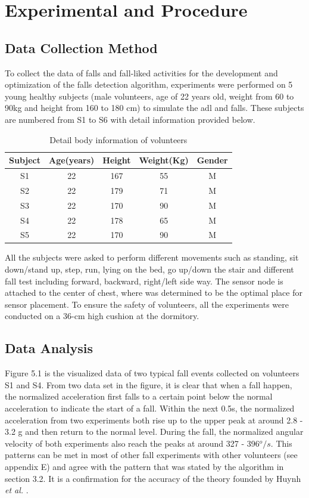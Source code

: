 \documentclass[letterpaper,12pt,titlepage,oneside,final]{book}
\begin{document}
\chapter{Experimental and Procedure}

\section{Data Collection Method}
To collect the data of falls and fall-liked activities for the development and optimization of the falls detection algorithm, experiments were performed on 5 young healthy subjects (male volunteers, age of 22 years old, weight from 60 to 90kg and height from 160 to 180 cm) to simulate the \gls{adl} and falls. These subjects are numbered from S1 to S6 with detail information provided below.
\begin{table}[h]
	\begin{center}
		\begin{tabular}{ |c|c|c|c|c| } 
			\hline
			Subject & Age(years) & Height & Weight(Kg) & Gender \\
			\hline
			S1 & 22 & 167 & 55 & M\\ %
			S2 & 22 & 179 & 71 & M\\ %
			S3 & 22 & 170 & 90 & M\\ %
			S4 & 22 & 178 & 65 & M\\ %
			S5 & 22 & 170 & 90 & M\\ %
			\hline
		\end{tabular}
		\caption{Detail body information of volunteers}
		\label{table:1}
	\end{center}
\end{table}\par
All the subjects were asked to perform different movements such as standing, sit down/stand up, step, run, lying on the bed, go up/down the stair and different fall test including forward, backward, right/left side way. The sensor node is attached to the center of chest, where was determined to be the optimal place for sensor placement. To ensure the safety of volunteers, all the experiments were conducted on a 36-cm high cushion at the dormitory.
\section{Data Analysis}
Figure 5.1 is the visualized data of two typical fall events collected on volunteers S1 and S4. From two data set in the figure, it is clear that when a fall happen, the normalized acceleration first falls to a certain point below the normal acceleration to indicate the start of a fall. Within the next 0.5s, the normalized acceleration from two experiments both rise up to the upper peak at around 2.8 - 3.2 g and then return to the normal level. During the fall, the normalized angular velocity of both experiments also reach the peaks at around 327 - 396$^{o}/s$. This patterns can be met in most of other fall experiments with other volunteers (see appendix E) and agree with the pattern that was stated by the algorithm in section 3.2. It is a confirmation for the accuracy of the theory founded by Huynh \textit{et al.} \cite{main_quoc}.\\
\end{document}

